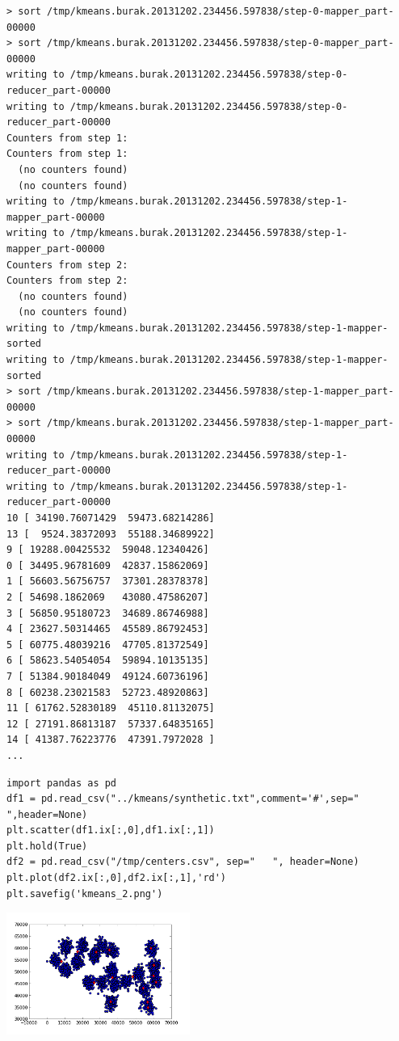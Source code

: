 \documentclass[12pt,fleqn]{article}\usepackage{../../common}
\begin{document}
\begin{verbatim}
> sort /tmp/kmeans.burak.20131202.234456.597838/step-0-mapper_part-00000
> sort /tmp/kmeans.burak.20131202.234456.597838/step-0-mapper_part-00000
writing to /tmp/kmeans.burak.20131202.234456.597838/step-0-reducer_part-00000
writing to /tmp/kmeans.burak.20131202.234456.597838/step-0-reducer_part-00000
Counters from step 1:
Counters from step 1:
  (no counters found)
  (no counters found)
writing to /tmp/kmeans.burak.20131202.234456.597838/step-1-mapper_part-00000
writing to /tmp/kmeans.burak.20131202.234456.597838/step-1-mapper_part-00000
Counters from step 2:
Counters from step 2:
  (no counters found)
  (no counters found)
writing to /tmp/kmeans.burak.20131202.234456.597838/step-1-mapper-sorted
writing to /tmp/kmeans.burak.20131202.234456.597838/step-1-mapper-sorted
> sort /tmp/kmeans.burak.20131202.234456.597838/step-1-mapper_part-00000
> sort /tmp/kmeans.burak.20131202.234456.597838/step-1-mapper_part-00000
writing to /tmp/kmeans.burak.20131202.234456.597838/step-1-reducer_part-00000
writing to /tmp/kmeans.burak.20131202.234456.597838/step-1-reducer_part-00000
10 [ 34190.76071429  59473.68214286]
13 [  9524.38372093  55188.34689922]
9 [ 19288.00425532  59048.12340426]
0 [ 34495.96781609  42837.15862069]
1 [ 56603.56756757  37301.28378378]
2 [ 54698.1862069   43080.47586207]
3 [ 56850.95180723  34689.86746988]
4 [ 23627.50314465  45589.86792453]
5 [ 60775.48039216  47705.81372549]
6 [ 58623.54054054  59894.10135135]
7 [ 51384.90184049  49124.60736196]
8 [ 60238.23021583  52723.48920863]
11 [ 61762.52830189  45110.81132075]
12 [ 27191.86813187  57337.64835165]
14 [ 41387.76223776  47391.7972028 ]       
...
\end{verbatim}

\begin{verbatim}
import pandas as pd
df1 = pd.read_csv("../kmeans/synthetic.txt",comment='#',sep="   ",header=None)
plt.scatter(df1.ix[:,0],df1.ix[:,1])
plt.hold(True)
df2 = pd.read_csv("/tmp/centers.csv", sep="   ", header=None)
plt.plot(df2.ix[:,0],df2.ix[:,1],'rd')
plt.savefig('kmeans_2.png')
\end{verbatim}

\includegraphics[height=4cm]{kmeans_2.png}
\end{document}
